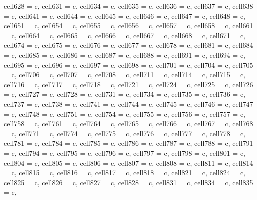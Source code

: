 \begin{longtblr}[
  label = none,
  entry = none,
]
{  cell{62}{8} = {c},
  cell{63}{1} = {c},
  cell{63}{4} = {c},
  cell{63}{5} = {c},
  cell{63}{6} = {c},
  cell{63}{7} = {c},
  cell{63}{8} = {c},
  cell{64}{1} = {c},
  cell{64}{4} = {c},
  cell{64}{5} = {c},
  cell{64}{6} = {c},
  cell{64}{7} = {c},
  cell{64}{8} = {c},
  cell{65}{1} = {c},
  cell{65}{4} = {c},
  cell{65}{5} = {c},
  cell{65}{6} = {c},
  cell{65}{7} = {c},
  cell{65}{8} = {c},
  cell{66}{1} = {c},
  cell{66}{4} = {c},
  cell{66}{5} = {c},
  cell{66}{6} = {c},
  cell{66}{7} = {c},
  cell{66}{8} = {c},
  cell{67}{1} = {c},
  cell{67}{4} = {c},
  cell{67}{5} = {c},
  cell{67}{6} = {c},
  cell{67}{7} = {c},
  cell{67}{8} = {c},
  cell{68}{1} = {c},
  cell{68}{4} = {c},
  cell{68}{5} = {c},
  cell{68}{6} = {c},
  cell{68}{7} = {c},
  cell{68}{8} = {c},
  cell{69}{1} = {c},
  cell{69}{4} = {c},
  cell{69}{5} = {c},
  cell{69}{6} = {c},
  cell{69}{7} = {c},
  cell{69}{8} = {c},
  cell{70}{1} = {c},
  cell{70}{4} = {c},
  cell{70}{5} = {c},
  cell{70}{6} = {c},
  cell{70}{7} = {c},
  cell{70}{8} = {c},
  cell{71}{1} = {c},
  cell{71}{4} = {c},
  cell{71}{5} = {c},
  cell{71}{6} = {c},
  cell{71}{7} = {c},
  cell{71}{8} = {c},
  cell{72}{1} = {c},
  cell{72}{4} = {c},
  cell{72}{5} = {c},
  cell{72}{6} = {c},
  cell{72}{7} = {c},
  cell{72}{8} = {c},
  cell{73}{1} = {c},
  cell{73}{4} = {c},
  cell{73}{5} = {c},
  cell{73}{6} = {c},
  cell{73}{7} = {c},
  cell{73}{8} = {c},
  cell{74}{1} = {c},
  cell{74}{4} = {c},
  cell{74}{5} = {c},
  cell{74}{6} = {c},
  cell{74}{7} = {c},
  cell{74}{8} = {c},
  cell{75}{1} = {c},
  cell{75}{4} = {c},
  cell{75}{5} = {c},
  cell{75}{6} = {c},
  cell{75}{7} = {c},
  cell{75}{8} = {c},
  cell{76}{1} = {c},
  cell{76}{4} = {c},
  cell{76}{5} = {c},
  cell{76}{6} = {c},
  cell{76}{7} = {c},
  cell{76}{8} = {c},
  cell{77}{1} = {c},
  cell{77}{4} = {c},
  cell{77}{5} = {c},
  cell{77}{6} = {c},
  cell{77}{7} = {c},
  cell{77}{8} = {c},
  cell{78}{1} = {c},
  cell{78}{4} = {c},
  cell{78}{5} = {c},
  cell{78}{6} = {c},
  cell{78}{7} = {c},
  cell{78}{8} = {c},
  cell{79}{1} = {c},
  cell{79}{4} = {c},
  cell{79}{5} = {c},
  cell{79}{6} = {c},
  cell{79}{7} = {c},
  cell{79}{8} = {c},
  cell{80}{1} = {c},
  cell{80}{4} = {c},
  cell{80}{5} = {c},
  cell{80}{6} = {c},
  cell{80}{7} = {c},
  cell{80}{8} = {c},
  cell{81}{1} = {c},
  cell{81}{4} = {c},
  cell{81}{5} = {c},
  cell{81}{6} = {c},
  cell{81}{7} = {c},
  cell{81}{8} = {c},
  cell{82}{1} = {c},
  cell{82}{4} = {c},
  cell{82}{5} = {c},
  cell{82}{6} = {c},
  cell{82}{7} = {c},
  cell{82}{8} = {c},
  cell{83}{1} = {c},
  cell{83}{4} = {c},
  cell{83}{5} = {c},
}
\end{longtblr}

